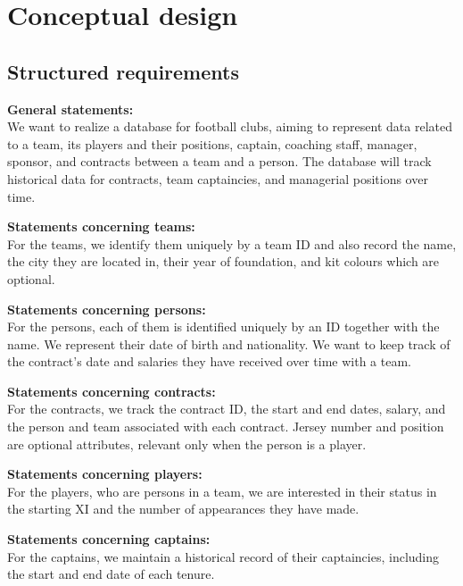 
\section{Conceptual design}\label{sec:conceptual-design}

\subsection{Structured requirements}\label{subsec:structured-requirements}

\setlength{\parindent}{0cm}
\vspace{12px}
\textbf{General statements:\\}
We want to realize a database for football clubs, aiming to represent data related to a team, its players and their positions, captain, coaching staff, manager, sponsor, and contracts between a team and a person. The database will track historical data for contracts, team captaincies, and managerial positions over time.

\vspace{12px}
\textbf{Statements concerning teams:\\}
For the teams, we identify them uniquely by a team ID and also record the name, the city they are located in, their year of foundation, and kit colours which are optional.

\vspace{12px}
\textbf{Statements concerning persons:\\}
 For the persons, each of them is identified uniquely by an ID together with the name. We represent their date of birth and nationality. We want to keep track of the contract’s date and salaries they have received over time with a team.

 \vspace{12px}
\textbf{Statements concerning contracts:\\}
For the contracts, we track the contract ID, the start and end dates, salary, and the person and team associated with each contract. Jersey number and position are optional attributes, relevant only when the person is a player.

\vspace{12px}
\textbf{Statements concerning players:\\}
For the players, who are persons in a team, we are interested in their status in the starting XI and the number of appearances they have made.

\vspace{12px}
\textbf{Statements concerning captains:\\}
For the captains, we maintain a historical record of their captaincies, including the start and end date of each tenure.

